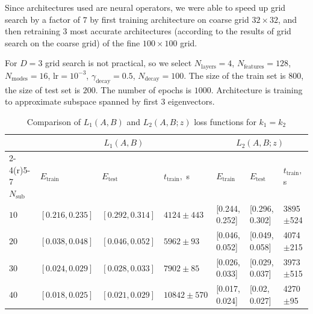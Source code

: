 \documentclass{article}
\begin{document}
Since architectures used are neural operators, we were able to speed up grid search by a factor of $7$ by first training architecture on coarse grid $32\times32$, and then retraining $3$ most accurate architectures (according to the results of grid search on the coarse grid) of the fine $100\times 100$ grid.

For $D=3$ grid search is not practical, so we select $N_{\text{layers}} = 4$, $N_{\text{features}} = 128$, $N_{\text{modes}} = 16$, $\text{lr} = 10^{-3}$,  $\gamma_{\text{decay}} = 0.5$, $N_{\text{decay}} = 100$. The size of the train set is $800$, the size of test set is $200$. The number of epochs is $1000$. Architecture is training to approximate subspace spanned by first $3$ eigenvectors.

\begin{table}[b!]
\caption{Comparison of $L_1(A, B)$ and $L_2(A, B; z)$ loss functions for $k_{1}=k_{2}$}
\label{a1_eq_a2_loss_comparison}
\begin{center}
\hspace*{-0.5cm}  
\begin{tabular}{lllllll}
\toprule
& \multicolumn{3}{c}{$L_1(A, B)$} &  \multicolumn{3}{c}{$L_2(A, B; z)$}\\
\cmidrule(r){2-4}\cmidrule(r){5-7}
$N_{\text{sub}}$ & $E_{\text{train}}$ & $E_{\text{test}}$ & $t_{\text{train}},$ s & $E_{\text{train}}$ & $E_{\text{test}}$ & $t_{\text{train}},$ s \\
\midrule
$10$ & $[0.216, 0.235]$ & $[0.292, 0.314]$ & $4124\pm443$ & [0.244, 0.252] & [0.296, 0.302] & 3895$\pm$524 \\
$20$ & $[0.038, 0.048]$ & $[0.046, 0.052]$ & $5962\pm93$ & [0.046, 0.052] & [0.049, 0.058] & 4074$\pm$215 \\
$30$ & $[0.024, 0.029]$ & $[0.028, 0.033]$ & $7902\pm85$ & [0.026, 0.033] & [0.029, 0.037] & 3973$\pm$515 \\
$40$ & $[0.018, 0.025]$ & $[0.021, 0.029]$ & $10842\pm570$ & [0.017, 0.024] & [0.02, 0.027] & 4270$\pm$95 \\
\bottomrule
\end{tabular}
\end{center}
\end{table}
\end{document}
